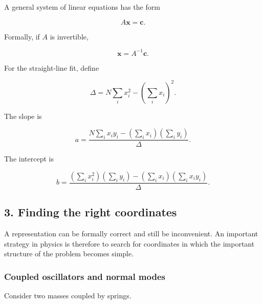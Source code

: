 A general system of linear equations has the form

\begin{equation}
    A\mathbf{x}=\mathbf{c}.
\end{equation}

Formally, if $A$ is invertible,

\begin{equation}
    \mathbf{x}=A^{-1}\mathbf{c}.
\end{equation}

For the straight-line fit, define

\begin{equation}
    \Delta=N\sum_i x_i^2-\left(\sum_i x_i\right)^2.
\end{equation}

The slope is

\begin{equation}
    \boxed{a=\frac{N\sum_i x_i y_i-\left(\sum_i x_i\right)\left(\sum_i y_i\right)}{\Delta}.}
\end{equation}

The intercept is

\begin{equation}
    \boxed{b=\frac{\left(\sum_i x_i^2\right)\left(\sum_i y_i\right)-\left(\sum_i x_i\right)\left(\sum_i x_i y_i\right)}{\Delta}.}
\end{equation}


\subsection{3. Finding the right coordinates}

A representation can be formally correct and still be inconvenient.
An important strategy in physics is therefore to search for coordinates in which the important structure of the problem becomes simple.


\subsubsection{Coupled oscillators and normal modes}

Consider two masses coupled by springs.

